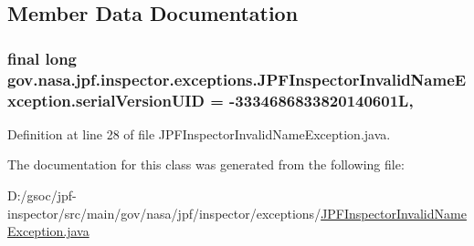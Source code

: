 \subsection{Member Data Documentation}
\subsubsection[{\texorpdfstring{serial\+Version\+U\+ID}{serialVersionUID}}]{\setlength{\rightskip}{0pt plus 5cm}final long gov.\+nasa.\+jpf.\+inspector.\+exceptions.\+J\+P\+F\+Inspector\+Invalid\+Name\+Exception.\+serial\+Version\+U\+ID = -\/3334686833820140601L\hspace{0.3cm}{\ttfamily [static]}, {\ttfamily [private]}}\hypertarget{classgov_1_1nasa_1_1jpf_1_1inspector_1_1exceptions_1_1_j_p_f_inspector_invalid_name_exception_a253867bde3fd3f3b3a54a273709c340c}{}\label{classgov_1_1nasa_1_1jpf_1_1inspector_1_1exceptions_1_1_j_p_f_inspector_invalid_name_exception_a253867bde3fd3f3b3a54a273709c340c}


Definition at line 28 of file J\+P\+F\+Inspector\+Invalid\+Name\+Exception.\+java.



The documentation for this class was generated from the following file\+:\begin{DoxyCompactItemize}
\item 
D\+:/gsoc/jpf-\/inspector/src/main/gov/nasa/jpf/inspector/exceptions/\hyperlink{_j_p_f_inspector_invalid_name_exception_8java}{J\+P\+F\+Inspector\+Invalid\+Name\+Exception.\+java}\end{DoxyCompactItemize}
